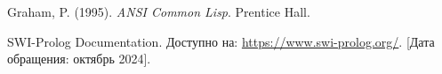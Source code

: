 \begin{thebibliography}{}
	
	 Graham, P. (1995). \textit{ANSI Common Lisp}. Prentice Hall.

	 SWI-Prolog Documentation. Доступно на: \url{https://www.swi-prolog.org/}. [Дата обращения: октябрь 2024].

	
\end{thebibliography}
